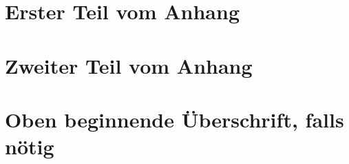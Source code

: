 

\chapter{Erster Teil vom Anhang}


\chapter{Zweiter Teil vom Anhang}



{
\renewcommand*{\chapterheadstartvskip}{\vspace*{-0.5cm}}

\chapter{Oben beginnende Überschrift, falls nötig}
}




